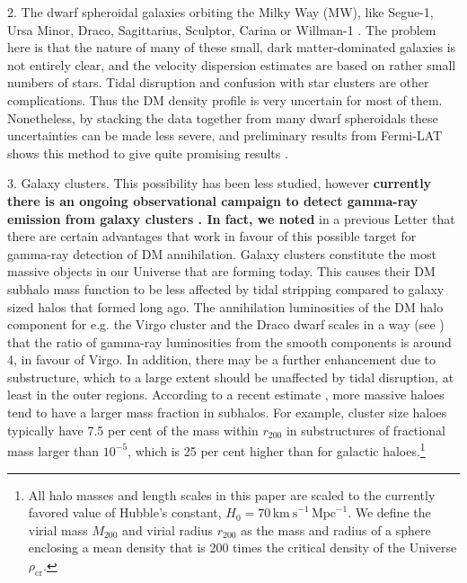 \documentclass[10pt,aps,pra,reprint,amsmath,amsfonts,amssymb,showpacs,nofootinbib,floatfix]{revtex4-1}
\def\C#1{{\bf #1}}
\newcommand{\rmn}{\mathrm}
\newcommand{\rvir}{r_{200}}
\newcommand{\mvir}{M_{200}}
\begin{document}
2. The dwarf spheroidal galaxies orbiting the Milky Way (MW), like
Segue-1, Ursa Minor, Draco, Sagittarius, Sculptor, Carina or Willman-1
\cite{2009JCAP...01..016B,2010ApJ...720.1174A,2010JCAP...01..031S,2010JCAP...01..031S,2011arXiv1103.0477T,2011APh....34..608H}. The
problem here is that the nature of many of these small, dark
matter-dominated galaxies is not entirely clear, and the velocity
dispersion estimates are based on rather small numbers of stars. Tidal
disruption and confusion with star clusters are other
complications. Thus the DM density profile is very uncertain for most
of them. Nonetheless, by stacking the data together from many dwarf
spheroidals these uncertainties can be made less severe, and
preliminary results from Fermi-LAT shows this method to give quite
promising results \cite{garde}.

3. Galaxy clusters. This possibility has been less studied, however
\C{currently there is an ongoing observational campaign to detect
  gamma-ray emission from galaxy clusters
  \cite{2010ApJ...710..634A,2010JCAP...05..025A,2009A&A...495...27A,2009IJMPD..18.1627D,2009A&A...502..437A,2009arXiv0907.5000G,2009ApJ...704..240K,2009ApJ...706L.275A,2010ApJ...717L..71A}. In fact, we noted} in a previous Letter
\cite{2009PhRvL.103r1302P} that there are certain advantages that work
in favour of this possible target for gamma-ray detection of DM
annihilation. Galaxy clusters constitute the most massive objects in
our Universe that are forming today. This causes their DM subhalo mass
function to be less affected by tidal stripping compared to galaxy
sized halos that formed long ago.  The annihilation luminosities of
the DM halo component for e.g. the Virgo cluster and the Draco dwarf
scales in a way (see \cite{2009PhRvL.103r1302P}) that the ratio of
gamma-ray luminosities from the smooth components is around 4, in
favour of Virgo. In addition, there may be a further enhancement due
to substructure, which to a large extent should be unaffected by tidal
disruption, at least in the outer regions.  According to a recent
estimate \cite{2011MNRAS.410.2309G}, more massive haloes tend to have
a larger mass fraction in subhalos.  For example, cluster size haloes
typically have 7.5 per cent of the mass within $r_{200}$ in
substructures of fractional mass larger than $10^{-5}$, which is 25
per cent higher than for galactic haloes.\footnote{All halo masses and
  length scales in this paper are scaled to the currently favored
  value of Hubble's constant, $H_0 = 70\,
  \rmn{km~s}^{-1}\,\rmn{Mpc}^{-1}$. We define the virial mass $\mvir$
  and virial radius $\rvir$ as the mass and radius of a sphere
  enclosing a mean density that is 200 times the critical density of
  the Universe $\rho_{\rmn{cr}}$.}
\end{document}
